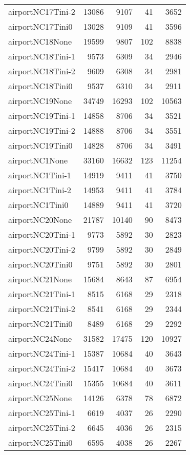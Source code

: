 \begin{longtable}{lrrrr}
airportNC17Tini-2 & 13086 & 9107 & 41 & 3652 \\
airportNC17Tini0 & 13028 & 9109 & 41 & 3596 \\
airportNC18None & 19599 & 9807 & 102 & 8838 \\
airportNC18Tini-1 & 9573 & 6309 & 34 & 2946 \\
airportNC18Tini-2 & 9609 & 6308 & 34 & 2981 \\
airportNC18Tini0 & 9537 & 6310 & 34 & 2911 \\
airportNC19None & 34749 & 16293 & 102 & 10563 \\
airportNC19Tini-1 & 14858 & 8706 & 34 & 3521 \\
airportNC19Tini-2 & 14888 & 8706 & 34 & 3551 \\
airportNC19Tini0 & 14828 & 8706 & 34 & 3491 \\
airportNC1None & 33160 & 16632 & 123 & 11254 \\
airportNC1Tini-1 & 14919 & 9411 & 41 & 3750 \\
airportNC1Tini-2 & 14953 & 9411 & 41 & 3784 \\
airportNC1Tini0 & 14889 & 9411 & 41 & 3720 \\
airportNC20None & 21787 & 10140 & 90 & 8473 \\
airportNC20Tini-1 & 9773 & 5892 & 30 & 2823 \\
airportNC20Tini-2 & 9799 & 5892 & 30 & 2849 \\
airportNC20Tini0 & 9751 & 5892 & 30 & 2801 \\
airportNC21None & 15684 & 8643 & 87 & 6954 \\
airportNC21Tini-1 & 8515 & 6168 & 29 & 2318 \\
airportNC21Tini-2 & 8541 & 6168 & 29 & 2344 \\
airportNC21Tini0 & 8489 & 6168 & 29 & 2292 \\
airportNC24None & 31582 & 17475 & 120 & 10927 \\
airportNC24Tini-1 & 15387 & 10684 & 40 & 3643 \\
airportNC24Tini-2 & 15417 & 10684 & 40 & 3673 \\
airportNC24Tini0 & 15355 & 10684 & 40 & 3611 \\
airportNC25None & 14126 & 6378 & 78 & 6872 \\
airportNC25Tini-1 & 6619 & 4037 & 26 & 2290 \\
airportNC25Tini-2 & 6645 & 4036 & 26 & 2315 \\
airportNC25Tini0 & 6595 & 4038 & 26 & 2267 \\

\end{longtable}
